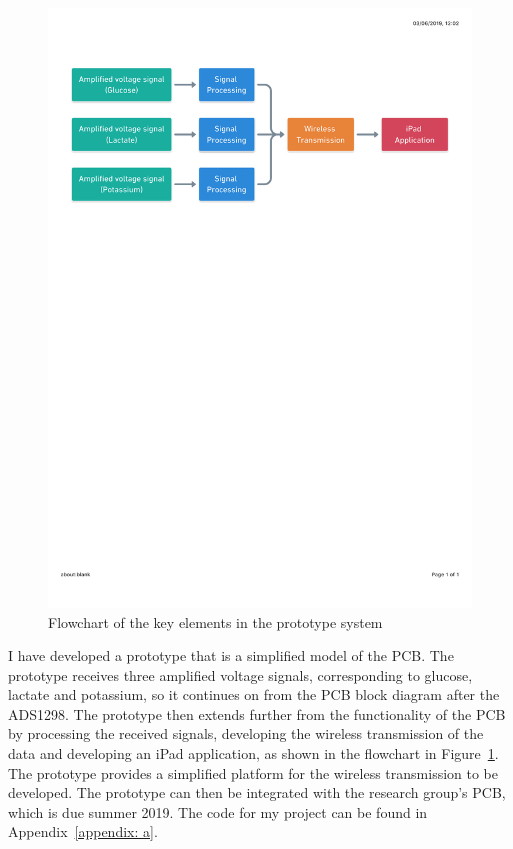 \begin{figure}[b!]
\centering
\includegraphics[trim={0cm 19.5cm 0.5cm  2.5cm}, clip, width=1\textwidth]{./figures/Flowchart.pdf}
\captionsetup{justification=centering}
\caption{Flowchart of the key elements in the prototype system}
\label{fig: flowchart}
\end{figure}

I have developed a prototype that is a simplified model of the PCB. The prototype receives three amplified voltage signals, corresponding to glucose, lactate and potassium, so it continues on from the PCB block diagram after the ADS1298. The prototype then extends further from the functionality of the PCB by processing the received signals, developing the wireless transmission of the data and developing an iPad application, as shown in the flowchart in Figure~\ref{fig: flowchart}. The prototype provides a simplified platform for the wireless transmission to be developed. The prototype can then be integrated with the research group's PCB, which is due summer 2019. The code for my project can be found in Appendix~\ref{appendix: a}.



